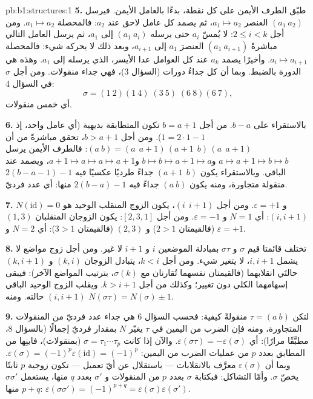 \begin{solution}{pb:b1:structures:1}
\textbf{5.} طبّق الطرف الأيمن على كل نقطة، بدءًا بالعامل
الأيمن. فيرسل $(a_1\ a_2)$ العنصر $a_1 \mapsto a_2$، ثم يصمد كل عامل
لاحق عند $a_2$: فالمحصلة $a_1 \mapsto a_2$. ومن أجل $2 \leq i < k$:
لا يُمسّ $a_i$ حتى يرسله $(a_1\ a_i)$ إلى $a_1$، ثم
يرسل العامل التالي مباشرةً $(a_1\ a_{i+1})$ العنصرَ $a_1$ إلى $a_{i+1}$، وبعد
ذلك لا يحركه شيء: فالمحصلة $a_i \mapsto a_{i+1}$. وأخيرًا يصمد $a_k$
عند كل العوامل عدا الأيسر، الذي يرسله إلى $a_1$.
وهذه هي الدورة بالضبط. وبما أن كل  جداءُ
دورات (السؤال 3)، فهي جداء منقولات. ومن أجل
$\sigma$ في السؤال 4:
\[
\sigma = (1\ 2)(1\ 4)\;(3\ 5)\;(6\ 8)(6\ 7),
\]
أي خمس منقولات.

\textbf{6.} بالاستقراء على $b - a$. من أجل $b = a + 1$ تكون المتطابقة
بديهية (أي عامل واحد، إذ $1 = 2\cdot1 - 1$). ومن أجل $b > a + 1$، تحقق
مباشرةً من أن $(a\ b) = (a\ \ a{+}1)\,(a{+}1\ \ b)\,(a\ \ a{+}1)$:
فالطرف الأيمن يرسل $a \mapsto a{+}1 \mapsto b \mapsto b$ و$b
\mapsto b \mapsto a{+}1 \mapsto a$ و$a{+}1 \mapsto a \mapsto a
\mapsto a{+}1$، ويصمد عند الباقي. وبالاستقراء يكون $(a{+}1\ \ b)$
جداءً طرديًا عكسيًا فيه $2(b - a - 1) - 1$ منقولة
متجاورة، ومنه يكون $(a\ b)$ جداءً فيه $2(b - a) - 1$ منها: أي عدد
فرديّ.

\textbf{7.} $N(\mathrm{id}) = 0$ و $\varepsilon = +1$. ومن أجل $(i\ \
i{+}1)$، يكون الزوج المنقلب الوحيد هو $(i, i+1)$: أي $N = 1$
و $\varepsilon = -1$. ومن أجل $[2, 3, 1]$: يكون الزوجان المنقلبان $(1,
3)$ (فالقيمتان $2 > 1$) و $(2, 3)$ (فالقيمتان $3 > 1$): أي $N = 2$
و $\varepsilon = +1$.

\textbf{8.} تختلف قائمتا قيم $\sigma$ و $\sigma\tau$
بمبادلة الموضعين $i$ و $i + 1$ لا غير. ومن أجل زوج
مواضع لا يشمل $i, i+1$، لا يتغير شيء. ومن أجل $k < i$،
يتبادل الزوجان $(k, i)$ و $(k, i+1)$ حالتَي انقلابهما
(فالقيمتان نفسهما تُقارنان مع $\sigma(k)$، بترتيب المواضع
الآخر): فيبقى إسهامهما الكلي دون تغيير؛ وكذلك من أجل $k > i + 1$.
ويقلب الزوج الوحيد الباقي $(i,
i+1)$ حالته. ومنه $N(\sigma\tau) = N(\sigma) \pm 1$.

\textbf{9.} لتكن $\tau = (a\ b)$ منقولةً كيفية: فحسب
السؤال 6 هي جداء عدد فرديّ من المنقولات
المتجاورة، ومنه فإن الضرب من اليمين في $\tau$ يغيّر $N$ بمقدار
فرديّ إجمالًا (بالسؤال 8، مطبَّقًا مرارًا): أي $\varepsilon(\sigma
\tau) = -\varepsilon(\sigma)$. والآن إذا كانت $\sigma = \tau_1\cdots
\tau_p$ (بمنقولات)، فابنِها من \omterm{def:b1:logic:map}{التطبيق} المطابق بعدد $p$ من عمليات الضرب من اليمين: $\varepsilon(\sigma) =
(-1)^p\varepsilon(\mathrm{id}) = (-1)^p$. وبما أن
$\varepsilon(\sigma)$ معرَّف بالانقلابات --- باستقلال
عن أيّ تعميل --- تكون زوجية $p$ ثابتًا يخصّ
$\sigma$. وأمّا التشاكل: فبكتابة $\sigma$ بعدد $p$ من المنقولات و $\sigma'$ بعدد $q$ منها، يستعمل $\sigma\sigma'$ منها $p + q$:
$\varepsilon(\sigma\sigma') = (-1)^{p+q} =
\varepsilon(\sigma)\varepsilon(\sigma')$.


\end{solution}
